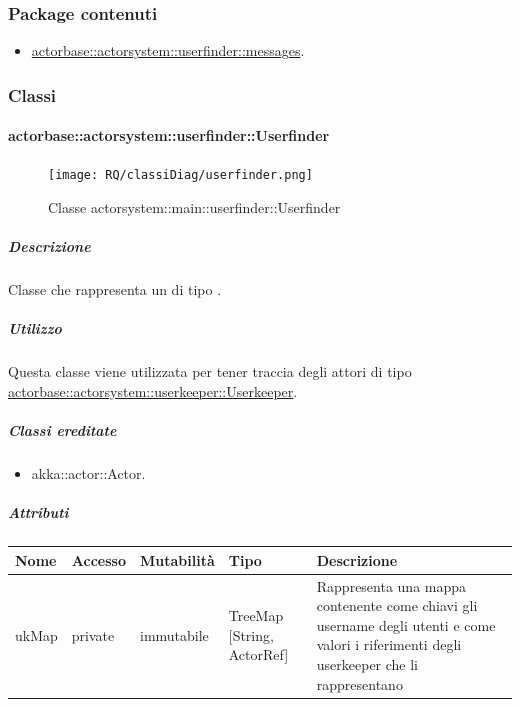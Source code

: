 \documentclass{scalatekids-article}
\begin{document}
\subsubsection{Package contenuti}
\begin{itemize}
\item \hyperref[sec:actorbase::actorsystem::userfinder::messages]{actorbase::actorsystem::userfinder::messages}.
\end{itemize}

\subsubsection{Classi}

\paragraph{actorbase::actorsystem::userfinder::Userfinder}
\label{sec:actorbase::actorsystem::userfinder::Userfinder}

\begin{figure}[H]
   \begin{center}
     \texttt{[image: RQ/classiDiag/userfinder.png]}
     \caption{Classe actorsystem::main::userfinder::Userfinder}
   \end{center}
 \end{figure}

\subparagraph{Descrizione}
Classe che rappresenta un  di tipo .

\subparagraph{Utilizzo}
Questa classe viene utilizzata per tener traccia degli attori di tipo
\hyperref[sec:actorbase::actorsystem::userkeeper::Userkeeper]{actorbase::actorsystem::userkeeper::Userkeeper}.

\subparagraph{Classi ereditate}
\begin{itemize}
\item akka::actor::Actor.
\end{itemize}

\subparagraph{Attributi}
\begin{tabular}{| p{3cm} | p{1.5cm} | p{2cm} | p{2cm} | p{8.5cm} |}
  \hline
  Nome & Accesso & Mutabilità & Tipo & Descrizione\\
  \hline
  ukMap & private & immutabile & TreeMap [String, ActorRef] & Rappresenta una mappa contenente come chiavi gli username degli utenti e come valori i riferimenti degli userkeeper che li rappresentano \\
  \hline
\end{tabular}
\end{document}
